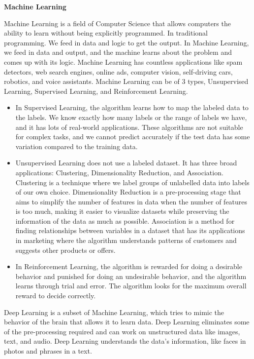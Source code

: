 \textbf{Machine Learning}

Machine Learning is a field of Computer Science that allows computers the ability to learn without being explicitly programmed. In traditional programming. We feed in data and logic to get the output. In Machine Learning, we feed in data and output, and the machine learns about the problem and comes up with its logic. Machine Learning has countless applications like spam detectors, web search engines, online ads, computer vision, self-driving cars, robotics, and voice assistants. Machine Learning can be of 3 types, Unsupervised Learning, Supervised Learning, and Reinforcement Learning. 


\begin{itemize}
\item In Supervised Learning, the algorithm learns how to map the labeled data to the labels. We know exactly how many labels or the range of labels we have, and it has lots of real-world applications. These algorithms are not suitable for complex tasks, and we cannot predict accurately if the test data has some variation compared to the training data.

\item Unsupervised Learning does not use a labeled dataset. It has three broad applications: Clustering, Dimensionality Reduction, and Association. Clustering is a technique where we label groups of unlabelled data into labels of our own choice. Dimensionality Reduction is a pre-processing stage that aims to simplify the number of features in data when the number of features is too much, making it easier to visualize datasets while preserving the information of the data as much as possible. Association is a method for finding relationships between variables in a dataset that has its applications in marketing where the algorithm understands patterns of customers and suggests other products or offers.

\item In Reinforcement Learning, the algorithm is rewarded for doing a desirable behavior and punished for doing an undesirable behavior, and the algorithm learns through trial and error. The algorithm looks for the maximum overall reward to decide correctly.
\end{itemize}

Deep Learning is a subset of Machine Learning, which tries to mimic the behavior of the brain that allows it to learn data. Deep Learning eliminates some of the pre-processing required and can work on unstructured data like images, text, and audio. Deep Learning understands the data's information, like faces in photos and phrases in a text.

